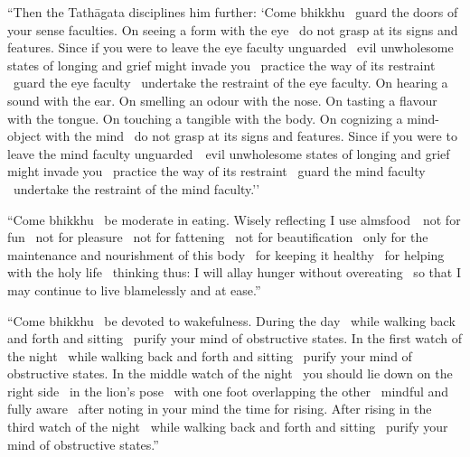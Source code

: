 \begin{english-only-justify}
  ``Then the Tathāgata disciplines him further: `Come bhikkhu \breathmark\ guard the doors of your sense faculties. On seeing a form with the eye \breathmark\ do not grasp at its signs and features. Since if you were to leave the eye faculty unguarded \breathmark\ evil unwholesome states of longing and grief might invade you \breathmark\ practice the way of its restraint \breathmark\ guard the eye faculty \breathmark\ undertake the restraint of the eye faculty. On hearing a sound with the ear. On smelling an odour with the nose. On tasting a flavour with the tongue. On touching a tangible with the body. On cognizing a mind-object with the mind \breathmark\ do not grasp at its signs and features. Since if you were to leave the mind faculty \mbox{unguarded}~\breathmark\ evil unwholesome states of longing and grief might invade you \breathmark\ practice the way of its restraint \breathmark\ guard the mind faculty \breathmark\ undertake the restraint of the mind faculty.''
\end{english-only-justify}

\begin{english-only-justify}
  ``Come bhikkhu \breathmark\ be moderate in eating. Wisely reflecting I use \mbox{almsfood}~\breathmark\ not for fun \breathmark\ not for pleasure \breathmark\ not for fattening \breathmark\ not for beautification \breathmark\ only for the maintenance and nourishment of this body \breathmark\ for keeping it healthy \breathmark\ for helping with the holy life \breathmark\ thinking thus: I will allay hunger without overeating \breathmark\ so that I may continue to live blamelessly and at ease.''
\end{english-only-justify}

\begin{english-only-justify}
  ``Come bhikkhu \breathmark\ be devoted to wakefulness. During the day \breathmark\ while walking back and forth and sitting \breathmark\ purify your mind of obstructive states. In the first watch of the night \breathmark\ while walking back and forth and sitting \breathmark\ purify your mind of obstructive states. In the middle watch of the night \breathmark\ you should lie down on the right side \breathmark\ in the lion's pose \breathmark\ with one foot overlapping the other \breathmark\ mindful and fully aware \breathmark\ after noting in your mind the time for rising. After rising in the third watch of the night \breathmark\ while walking back and forth and sitting \breathmark\ purify your mind of obstructive states.''
\end{english-only-justify}

